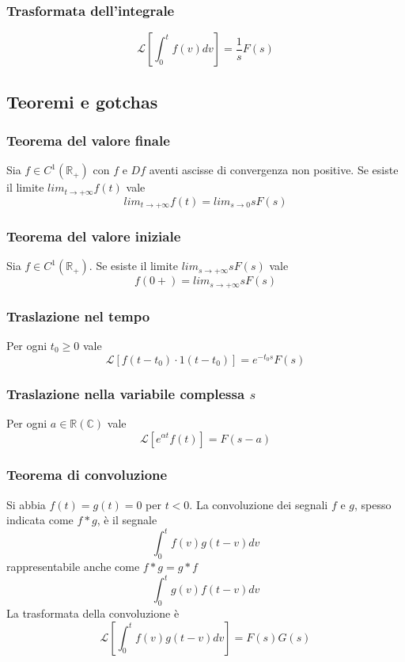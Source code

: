 \documentclass[11pt]{article}
\begin{document}
\subsubsection{Trasformata dell'integrale}
\begin{displaymath}
    \mathcal{L}\left[\int_0^t f(v) dv\right] = \frac{1}{s} F(s)
\end{displaymath}
\subsection{Teoremi e gotchas}
\subsubsection{Teorema del valore finale}
Sia $f\in C^1 (\mathbb{R}_+)$ con $f$ e $Df$ aventi ascisse di convergenza non positive. Se esiste il limite $lim_{t\rightarrow+\infty} f(t)$ vale
\begin{displaymath}
    lim_{t\rightarrow+\infty} f(t) = lim_{s\rightarrow0} sF(s)
\end{displaymath}
\subsubsection{Teorema del valore iniziale}
Sia $f\in C^1 (\mathbb{R}_+)$. Se esiste il limite $lim_{s\rightarrow+\infty} sF(s)$ vale
\begin{displaymath}
    f(0+)=lim_{s\rightarrow+\infty} sF(s)
\end{displaymath}
\subsubsection{Traslazione nel tempo}
Per ogni $t_0 \ge 0$ vale 
\begin{displaymath}
    \mathcal{L}[f(t-t_0)\cdot 1(t-t_0)]= e^{-t_0s}F(s)
\end{displaymath}
\subsubsection{Traslazione nella variabile complessa $s$}
Per ogni $a \in \mathbb{R}(\mathbb{C})$ vale 
\begin{displaymath}
    \mathcal{L}[e^{\alpha t} f(t)] = F(s-a)
\end{displaymath}
\subsubsection{Teorema di convoluzione}
Si abbia $f(t) = g(t)=0$ per $t<0$. La convoluzione dei segnali $f$ e $g$, spesso indicata come $f*g$, è il segnale 
\begin{displaymath}
    \int_0^t f(v)g(t-v)dv
\end{displaymath}
rappresentabile anche come $f*g=g*f$
\begin{displaymath}
    \int_0^t g(v) f(t-v) dv
\end{displaymath}
La trasformata della convoluzione è 
\begin{displaymath}
    \mathcal{L}\left[    \int_0^t f(v)g(t-v)dv\right] = F(s)G(s)
\end{displaymath}
\end{document}
